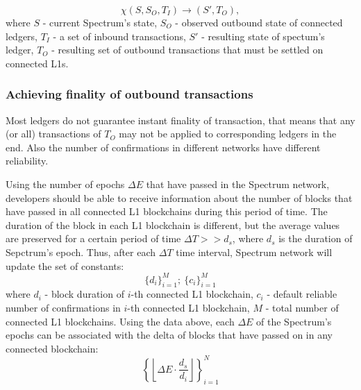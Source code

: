 \documentclass{article}
\begin{document}
    \begin{equation}
        \chi(S, S_O, T_I) \rightarrow (S', T_O),\label{eq:equation2}
    \end{equation}
    where $S$ - current Spectrum's state, $S_O$ - observed outbound state of connected ledgers, $T_I$ - a set of inbound transactions, $S'$ - resulting state of spectum's ledger, $T_O$ - resulting set of outbound transactions that must be settled on connected L1s.

    \subsubsection{Achieving finality of outbound transactions}
    Most ledgers do not guarantee instant finality of transaction, that means that any (or all) transactions of $T_O$ may not be applied to corresponding ledgers in the end. Also the number of confirmations in different networks have different reliability.


    Using the number of epochs $\Delta E$ that have passed in the Spectrum network, developers should be able to receive information about the number of blocks that have passed in all connected L1 blockchains during this period of time. The duration of the block in each L1 blockchain is different, but the average values are preserved for a certain period of time $\Delta T >> d_s$, where $d_s$ is the duration of Sepctrum's epoch. Thus, after each $\Delta T$ time interval, Spectrum network will update the set of constants:
    \begin{equation}
        \{d_{i}\}_{i=1}^{M};\
        \{c_{i}\}_{i=1}^{M}\label{eq:equation3}
    \end{equation}
    where $d_i$ - block duration of $i$-th connected L1 blockchain, $c_i$ - default reliable number of confirmations in $i$-th connected L1 blockchain, $M$ - total number of connected L1 blockchains. Using the data above, each $\Delta E$ of the Spectrum's epochs can be associated with the delta of blocks that have passed on in any connected blockchain:
    \begin{equation}
        \left\{ \left\lfloor\Delta E \cdot \frac{d_s}{d_i}\right\rfloor \right\}_{i=1}^{N}\label{eq:equation4}
    \end{equation}
\end{document}

